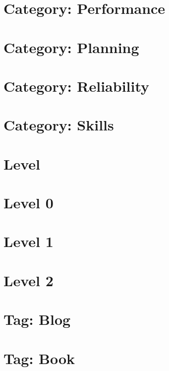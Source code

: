 \documentclass[twoside]{book}
\newcommand{\+}{\discretionary{\mbox{\scriptsize$\hookleftarrow$}}{}{}}
\begin{document}
\chapter{Category\+: Performance}
\label{md_markdown_category_performance}

\chapter{Category\+: Planning}
\label{md_markdown_category_planning}

\chapter{Category\+: Reliability}
\label{md_markdown_category_reliability}

\chapter{Category\+: Skills}
\label{md_markdown_category_skills}

\chapter{Level}
\label{md_markdown_level}

\chapter{Level 0}
\label{md_markdown_level0}

\chapter{Level 1}
\label{md_markdown_level1}

\chapter{Level 2}
\label{md_markdown_level2}

\chapter{Tag\+: Blog}
\label{md_markdown_tag_blog}

\chapter{Tag\+: Book}
\label{md_markdown_tag_book}

\end{document}
